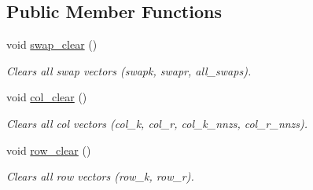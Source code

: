 \subsection*{Public Member Functions}
\begin{DoxyCompactItemize}
\item 
void \hyperlink{classswap__struct_ac67fad73735b183c372ef63b4a9cd581}{swap\+\_\+clear} ()\hypertarget{classswap__struct_ac67fad73735b183c372ef63b4a9cd581}{}\label{classswap__struct_ac67fad73735b183c372ef63b4a9cd581}

\begin{DoxyCompactList}\small\item\em Clears all swap vectors (swapk, swapr, all\+\_\+swaps). \end{DoxyCompactList}\item 
void \hyperlink{classswap__struct_ad97200ee23cd1f70668d6b4462228343}{col\+\_\+clear} ()\hypertarget{classswap__struct_ad97200ee23cd1f70668d6b4462228343}{}\label{classswap__struct_ad97200ee23cd1f70668d6b4462228343}

\begin{DoxyCompactList}\small\item\em Clears all col vectors (col\+\_\+k, col\+\_\+r, col\+\_\+k\+\_\+nnzs, col\+\_\+r\+\_\+nnzs). \end{DoxyCompactList}\item 
void \hyperlink{classswap__struct_a9727bf8ea70308977661235c59e3b8da}{row\+\_\+clear} ()\hypertarget{classswap__struct_a9727bf8ea70308977661235c59e3b8da}{}\label{classswap__struct_a9727bf8ea70308977661235c59e3b8da}

\begin{DoxyCompactList}\small\item\em Clears all row vectors (row\+\_\+k, row\+\_\+r). \end{DoxyCompactList}\end{DoxyCompactItemize}
